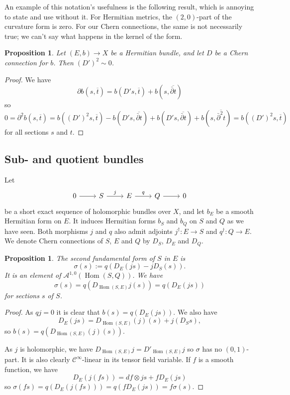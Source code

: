 \documentclass[10pt,a4paper]{amsart}
\newtheorem{prop}[theo]{Proposition}
\theoremstyle{definition}
\newcommand{\cc}[1]{\mathcal{#1}}
\def\ov#1{\overline{#1}}
\DeclareMathOperator{\Hom}{Hom}
\def\snd{\sigma}
\begin{document}
An example of this notation's usefulness is the following result, which is annoying to state and use without it. For Hermitian metrics, the $(2,0)$-part of the curvature form is zero. For our Chern connections, the same is not necessarily true; we can't say what happens in the kernel of the form.

\begin{prop}
Let $(E, b) \to X$ be a Hermitian bundle, and let $D$ be a Chern connection for $b$. Then $(D')^2 \sim 0$.
\end{prop}

\begin{proof}
We have
\[
\partial b(s, \ov t)
= b(D's, \ov t) + b(s, \ov{\bar\partial t})
\]
so
\[
0 = \partial^2 b(s, \ov t)
= b((D')^2s, \ov t)
- b(D's, \ov{\bar\partial t})
+ b(D's, \ov{\bar\partial t})
+ b(s, \ov{\bar\partial^2 t})
= b((D')^2s, \ov t)
\]
for all sections $s$ and $t$.
\end{proof}




\subsection*{Sub- and quotient bundles}

Let
\[
\begin{tikzcd}
0 \ar[r] &
S \ar[r,"j"] &
E \ar[r,"q"] &
Q \ar[r] &
0
\end{tikzcd}
\]
be a short exact sequence of holomorphic bundles over $X$, and let $b_E$ be a smooth Hermitian form on $E$. It induces Hermitian forms $b_S$ and $b_Q$ on $S$ and $Q$ as we have seen. Both morphisms $j$ and $q$ also admit adjoints $j^\dagger: E \to S$ and $q^\dagger : Q \to E$. We denote Chern connections of $S$, $E$ and $Q$ by $D_S$, $D_E$ and $D_Q$.




\begin{prop}
The \emph{second fundamental form} of $S$ in $E$ is
\[
\snd(s) := q(D_E(js) - jD_S(s)).
\]
It is an element of $\cc A^{1,0}(\Hom(S,Q))$.
We have
\[
\snd(s)
= q(D_{\Hom(S,E)}j(s))
= q(D_E(js))
\]
for sections $s$ of $S$.
\end{prop}

\begin{proof}
As $qj = 0$ it is clear that $b(s) = q(D_E(js))$. We also have
\[
D_E(js) = D_{\Hom(S,E)}(j)(s) + j(D_Ss),
\]
so $b(s) = q(D_{\Hom(S,E)}(j)(s))$.

As $j$ is holomorphic, we have $D_{\Hom(S,E)}j = D'_{\Hom(S,E)}j$ so $\snd$ has no $(0,1)$-part. It is also clearly $\cc C^\infty$-linear in its tensor field variable. If $f$ is a smooth function, we have
\[
D_E(j(fs))
= df \otimes js + f D_E(js)
\]
so $\snd(fs) = q(D_E(j(fs))) = q(f D_E(js)) = f\snd(s)$.
\end{proof}
\end{document}
